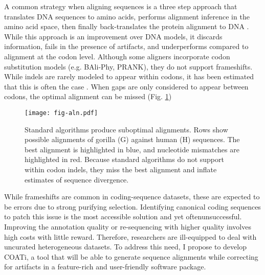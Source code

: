 A common strategy when aligning sequences is a three step approach that
translates DNA sequences to amino acids, performs alignment inference in the
amino acid space, then finally  back-translates the protein alignment to DNA
\parencite{bininda2005transalign, abascal2010translatorx}.
While this approach is an improvement over DNA models, it discards information,
fails in the presence of artifacts, and underperforms compared to alignment at
the codon level.
Although some aligners incorporate codon substitution models (e.g. BAli-Phy,
PRANK), they do not support frameshifts.
While indels are rarely modeled to appear within codons, it has been estimated
that this is often the case \parencite{indel_phases_zhu_2019}.
When gaps are only considered to appear between codons, the optimal alignment
can be missed (Fig. \ref{fig:indels})

\begin{figure}[h!]
  \begin{minipage}[c]{0.6\textwidth}
    \texttt{[image: fig-aln.pdf]}
  \end{minipage}\hfill
  \begin{minipage}[c]{0.4\textwidth}
	\caption{Standard algorithms produce suboptimal alignments.
		Rows show possible alignments of gorilla (G) against human (H) sequences.
		The best alignment is highlighted in blue, and nucleotide mismatches are highlighted in red.
		Because standard algorithms do not support within codon indels, they miss the best
		alignment and inflate estimates of sequence divergence.}
	\label{fig:indels}
  \end{minipage}
\end{figure}

While frameshifts are common in coding-sequence datasets, these are expected to
be errors due to strong purifying selection.
Identifying canonical coding sequences to patch this issue is the most
accessible solution and yet oftenunsuccessful.
Improving the annotation quality or re-sequencing with higher quality involves
high costs with little reward.
Therefore, researchers are ill-equipped to deal with uncurated heterogeneous
datasets.
To address this need, I propose to develop COATi, a tool that will be able to
generate sequence alignments while correcting for artifacts in a feature-rich
and user-friendly software package.

